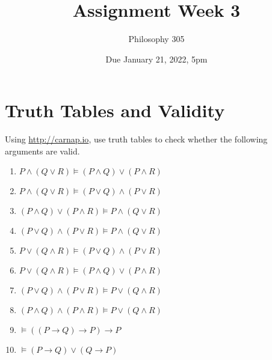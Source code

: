 \documentclass[
  11pt,
]{article}
\title{Assignment Week 3}
\author{Philosophy 305}
\date{Due January 21, 2022, 5pm}
\providecommand{\tightlist}{%
  \setlength{\itemsep}{0pt}\setlength{\parskip}{0pt}}
\begin{document}
\maketitle

\hypertarget{truth-tables-and-validity}{%
\section{Truth Tables and Validity}\label{truth-tables-and-validity}}

Using \url{http://carnap.io}, use truth tables to check whether the
following arguments are valid.

\begin{enumerate}
\def\labelenumi{\arabic{enumi}.}
\tightlist
\item
  \(P \wedge (Q \vee R) \vDash (P \wedge Q) \vee (P \wedge R)\)
\item
  \(P \wedge (Q \vee R) \vDash (P \vee Q) \wedge (P \vee R)\)
\item
  \((P \wedge Q) \vee (P \wedge R) \vDash P \wedge (Q \vee R)\)
\item
  \((P \vee Q) \wedge (P \vee R) \vDash P \wedge (Q \vee R)\)
\item
  \(P \vee (Q \wedge R) \vDash (P \vee Q) \wedge (P \vee R)\)
\item
  \(P \vee (Q \wedge R) \vDash (P \wedge Q) \vee (P \wedge R)\)
\item
  \((P \vee Q) \wedge (P \vee R) \vDash P \vee (Q \wedge R)\)
\item
  \((P \wedge Q) \wedge (P \wedge R) \vDash P \vee (Q \wedge R)\)
\item
  \(\vDash ((P \rightarrow Q) \rightarrow P) \rightarrow P\)
\item
  \(\vDash (P \rightarrow Q) \vee (Q \rightarrow P)\)
\end{enumerate}
\end{document}
